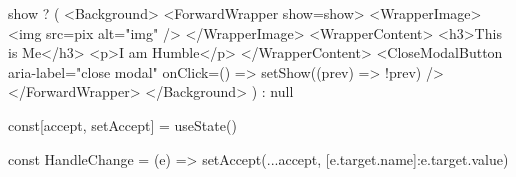 {show ? (
        <Background>
          <ForwardWrapper show={show}>
            <WrapperImage>
              <img src={pix} alt="img" />
            </WrapperImage>
            <WrapperContent>
              <h3>This is Me</h3>
              <p>I am Humble</p>
            </WrapperContent>
            <CloseModalButton
              aria-label="close modal"
              onClick={() => setShow((prev) => !prev)}
            />
          </ForwardWrapper>
        </Background>
      ) : null}



      const[accept, setAccept] = useState({})

      const HandleChange = (e) => {
        setAccept({...accept, [e.target.name]:e.target.value})
      }